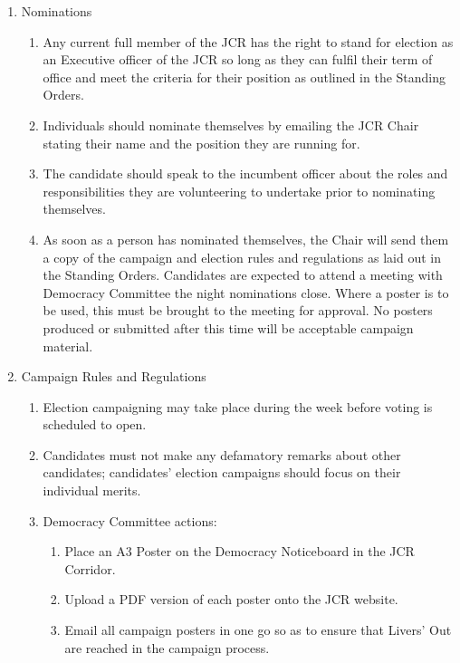 \begin{enumerate}
    \item Nominations
    \begin{enumerate}
        \item Any current full member of the JCR has the right to stand for election as an Executive officer of the JCR so long as they can fulfil their term of office and meet the criteria for their position as outlined in the Standing Orders.
        \item Individuals should nominate themselves by emailing the JCR Chair stating their name and the position they are running for.
        \item The candidate should speak to the incumbent officer about the roles and responsibilities they are volunteering to undertake prior to nominating themselves.
        \item As soon as a person has nominated themselves, the Chair will send them a copy of the campaign and election rules and regulations as laid out in the Standing Orders. Candidates are expected to attend a meeting with Democracy Committee the night nominations close. Where a poster is to be used, this must be brought to the meeting for approval. No posters produced or submitted after this time will be acceptable campaign material.
    \end{enumerate}
    \item Campaign Rules and Regulations
    \label{it:rules}
    \begin{enumerate}
        \item Election campaigning may take place during the week before voting is scheduled to open.
        \item Candidates must not make any defamatory remarks about other candidates; candidates’ election
        campaigns should focus on their individual merits.
        \item Democracy Committee actions:
        \begin{enumerate}
            \item Place an A3 Poster on the Democracy Noticeboard in the JCR Corridor.
            \item Upload a PDF version of each poster onto the JCR website.
            \item Email all campaign posters in one go so as to ensure that Livers’ Out are reached in the campaign process.

\end{enumerate}
\end{enumerate}
\end{enumerate}
